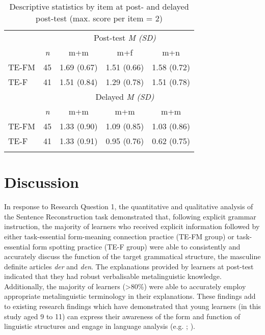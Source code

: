 \documentclass[output=paper]{langscibook}
\begin{document}
\begin{table}
\begin{tabular}{l *4{c}}
\lsptoprule
& & \multicolumn{3}{c}{Post-test \textit{M (SD)}}\\\cmidrule(lr){3-5}
~ & \textit{n} & m+m & m+f & m+n\\\midrule
 TE-FM & 45 & 1.69 (0.67) & 1.51 (0.66) & 1.58 (0.72) \\
 TE-F  & 41 & 1.51 (0.84) & 1.29 (0.78) & 1.51 (0.78) \\\midrule
& & \multicolumn{3}{c}{Delayed \textit{M (SD)}} \\\cmidrule(lr){3-5}
~ & \textit{n} & m+m & m+m & m+m\\\midrule
 TE-FM & 45 & 1.33 (0.90) & 1.09 (0.85) & 1.03 (0.86) \\
 TE-F  & 41 & 1.33 (0.91) & 0.95 (0.76) & 0.62 (0.75) \\
\lspbottomrule
\end{tabular}
\caption{Descriptive statistics by item at post- and delayed post-test (max. score per item = 2)\label{tab:kasprowicz:4}}
\end{table}

\section{Discussion}

In response to Research Question 1, the quantitative and qualitative analysis of the Sentence Reconstruction task demonstrated that, following explicit grammar instruction, the majority of learners who received explicit information followed by either task-essential form-meaning connection practice (TE-FM group) or task-essential form spotting practice (TE-F group) were able to consistently and accurately discuss the function of the target grammatical structure, the masculine definite articles \textit{der} and \textit{den}. The explanations provided by learners at post-test indicated that they had robust verbalisable metalinguistic knowledge. Additionally, the majority of learners (>80\%) were able to accurately employ appropriate metalinguistic terminology in their explanations. These findings add to existing research findings which have demonstrated that young learners (in this study aged 9 to 11) can express their awareness of the form and function of linguistic structures and engage in language analysis (e.g. \citealt{BouffardSarkar2008}; \citealt{HorstEtAl2010}).
\end{document}
